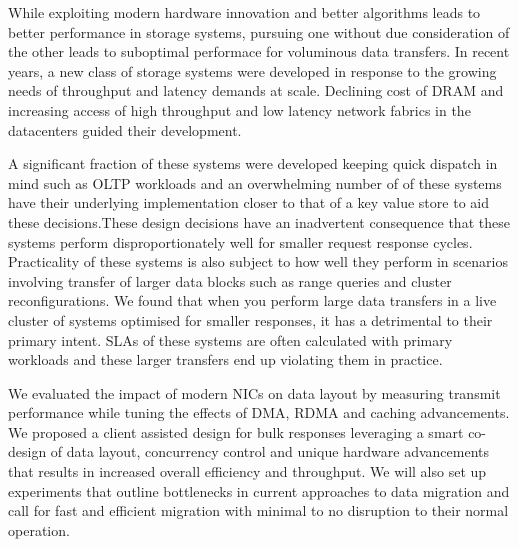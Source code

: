 

While exploiting modern hardware innovation and better algorithms leads to better performance 
in storage systems, pursuing one without due consideration of the other leads to
suboptimal performace for voluminous data transfers. In recent years, a new class
of storage systems were developed in response to the growing needs of throughput
and latency demands at scale. Declining cost of DRAM and increasing access of 
high throughput and low latency network fabrics in the datacenters guided their development.

A significant fraction of these systems were developed keeping quick dispatch in mind
such as OLTP workloads and an overwhelming number of of these systems have their underlying
implementation closer to that of a key value store to aid these decisions.These design 
decisions have an inadvertent consequence that these systems perform disproportionately
well for smaller request response cycles. Practicality of these systems is also subject to 
how well they perform in scenarios involving transfer of larger data blocks such as range queries 
and cluster reconfigurations. We found that when you perform large data transfers in a live cluster 
of systems optimised for smaller responses, it has a detrimental to their primary intent. 
SLAs of these systems are often calculated with primary workloads and these larger transfers end 
up violating them in practice.

We evaluated the impact of modern NICs on data layout by measuring transmit performance
while tuning the effects of DMA, RDMA and caching advancements. We proposed a client assisted design
for bulk responses leveraging a smart co-design of data layout, concurrency control and
unique hardware advancements that results in increased overall efficiency and throughput.
We will also set up experiments that outline bottlenecks in current approaches to data migration
and call for fast and efficient migration with minimal to no disruption to their normal operation.
